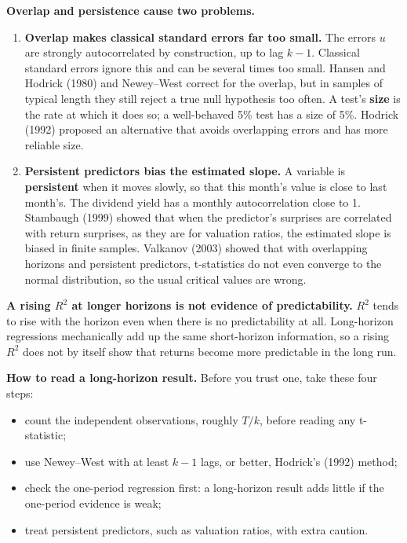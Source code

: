 \textbf{Overlap and persistence cause two problems.}

\begin{enumerate}
  \item \textbf{Overlap makes classical standard errors far too small.} The errors $u$ are strongly autocorrelated by construction, up to lag $k - 1$. Classical standard errors ignore this and can be several times too small. Hansen and Hodrick (1980) and Newey--West correct for the overlap, but in samples of typical length they still reject a true null hypothesis too often. A test's \textbf{size} is the rate at which it does so; a well-behaved 5\% test has a size of 5\%. Hodrick (1992) proposed an alternative that avoids overlapping errors and has more reliable size.
  \item \textbf{Persistent predictors bias the estimated slope.} A variable is \textbf{persistent} when it moves slowly, so that this month's value is close to last month's. The dividend yield has a monthly autocorrelation close to 1. Stambaugh (1999) showed that when the predictor's surprises are correlated with return surprises, as they are for valuation ratios, the estimated slope is biased in finite samples. Valkanov (2003) showed that with overlapping horizons and persistent predictors, t-statistics do not even converge to the normal distribution, so the usual critical values are wrong.
\end{enumerate}

\textbf{A rising $R^2$ at longer horizons is not evidence of predictability.} $R^2$ tends to rise with the horizon
even when there is no predictability at all. Long-horizon regressions
mechanically add up the same short-horizon information, so a rising $R^2$ does
not by itself show that returns become more predictable in the long run.

\textbf{How to read a long-horizon result.} Before you trust one, take these four steps:

\begin{itemize}
  \item count the independent observations, roughly $T/k$, before reading any t-statistic;
  \item use Newey--West with at least $k-1$ lags, or better, Hodrick's (1992) method;
  \item check the one-period regression first: a long-horizon result adds little if the one-period evidence is weak;
  \item treat persistent predictors, such as valuation ratios, with extra caution.
\end{itemize}

